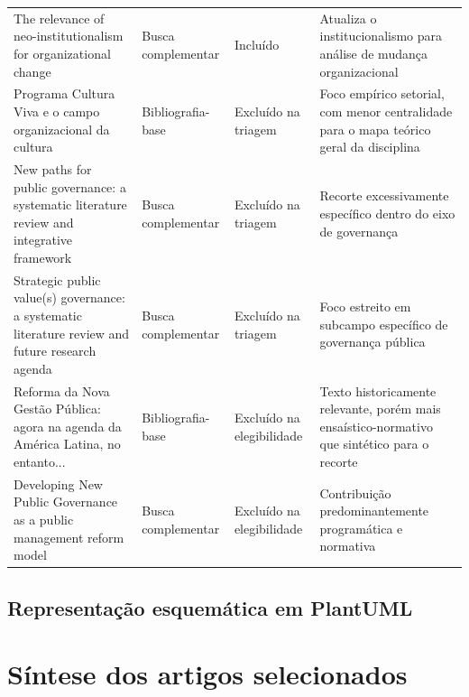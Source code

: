 \documentclass[12pt]{article}
\begin{document}
\begin{table}[htbp]
\begin{tabularx}{\textwidth}{>{\raggedright\arraybackslash}X >{\raggedright\arraybackslash}m{} >{\raggedright\arraybackslash}m{} >{\raggedright\arraybackslash}m{}}
The relevance of neo-institutionalism for organizational change & Busca complementar & Incluído & Atualiza o institucionalismo para análise de mudança organizacional \\
Programa Cultura Viva e o campo organizacional da cultura & Bibliografia-base & Excluído na triagem & Foco empírico setorial, com menor centralidade para o mapa teórico geral da disciplina \\
New paths for public governance: a systematic literature review and integrative framework & Busca complementar & Excluído na triagem & Recorte excessivamente específico dentro do eixo de governança \\
Strategic public value(s) governance: a systematic literature review and future research agenda & Busca complementar & Excluído na triagem & Foco estreito em subcampo específico de governança pública \\
Reforma da Nova Gestão Pública: agora na agenda da América Latina, no entanto... & Bibliografia-base & Excluído na elegibilidade & Texto historicamente relevante, porém mais ensaístico-normativo que sintético para o recorte \\
Developing New Public Governance as a public management reform model & Busca complementar & Excluído na elegibilidade & Contribuição predominantemente programática e normativa \\
\bottomrule
\end{tabularx}
\normalsize
\end{table}

\subsection{Representação esquemática em PlantUML}
\label{sec:org8a41c68}

\begin{center}

\end{center}

\section{Síntese dos artigos selecionados}
\label{sec:org0e12734}
\end{document}
